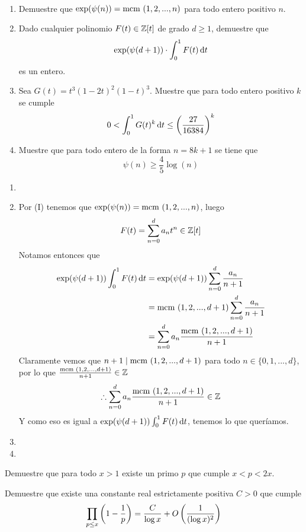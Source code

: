 \begin{prob}[2 pts. c/u]
	\
	\begin{enumerate}[label = (\roman*)]
		\item Demuestre que $\exp(\psi(n))=\text{mcm }(1,2,...,n)$ para todo entero positivo $n$.

		\item Dado cualquier polinomio $F(t)\in\mathbb{Z}[t]$ de grado $d\geq 1$, demuestre que
		\[\exp(\psi(d+1))\cdot\int^1_0F(t)\operatorname{d}\!{t}\]
		es un entero.

		\item Sea $G(t)=t^3(1-2t)^2(1-t)^3$. Muestre que para todo entero positivo $k$ se cumple
		\[0<\int^1_0G(t)^k\operatorname{d}\!{t}\leq\left(\frac{27}{16384}\right)^k\]

		\item Muestre que para todo entero de la forma $n=8k+1$ se tiene que
		\[\psi(n)\geq\frac{4}{5}\log(n)\]
	\end{enumerate}
\end{prob}

\begin{sol}
	\begin{enumerate}[label = (\roman*)]
		\item

		\item Por (I) tenemos que $\exp(\psi(n))=\text{mcm }(1,2,...,n)$, luego
		\[F(t)=\sum_{n=0}^da_nt^n\in\mathbb{Z}[t]\]
		Notamos entonces que
		\begin{align*}
			\exp(\psi(d+1))\int_0^1 F(t)\operatorname{d}\!{t}&=\exp(\psi(d+1))\sum_{n=0}^d\frac{a_n}{n+1}\\
			&=\text{mcm }(1,2,...,d+1)\sum_{n=0}^d\frac{a_n}{n+1}\\
			&=\sum_{n=0}^da_n\frac{\text{mcm }(1,2,...,d+1)}{n+1}
		\end{align*}
		Claramente vemos que $n+1\mid\text{mcm }(1,2,...,d+1)$ para todo $n\in\{0,1,...,d\}$, por lo que $\frac{\text{mcm }(1,2,...,d+1)}{n+1}\in\mathbb{Z}$
		\[\therefore \sum_{n=0}^da_n\frac{\text{mcm }(1,2,...,d+1)}{n+1}\in\mathbb{Z}\]
		Y como eso es igual a $\exp(\psi(d+1))\int_0^1F(t)\operatorname{d}\!{t}$, tenemos lo que queríamos.

		\item

		\item
	\end{enumerate}
\end{sol}

\begin{prob}[5 pts.]
	Demuestre que para todo $x>1$ existe un primo $p$ que cumple $x<p<2x$.
\end{prob}

\begin{sol}
	
\end{sol}

\begin{prob}[4 pts.]
	Demuestre que existe una constante real estrictamente positiva $C>0$ que cumple
	\[\prod_{p\leq x}\left(1-\frac{1}{p}\right)=\frac{C}{\log x}+O\left(\frac{1}{(\log x)^2}\right)\]
\end{prob}

\begin{sol}
	
\end{sol}

